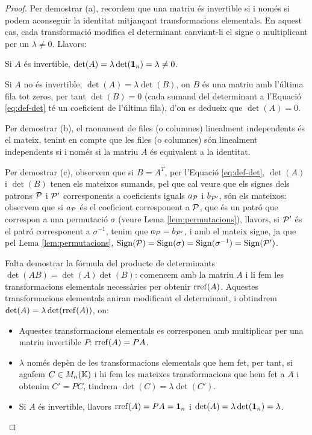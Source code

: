 \documentclass[
  11pt,
]{book}
\numberwithin{dummy}{section}
\theoremstyle{maincolornumbox}
\theoremstyle{blacknumex}
\theoremstyle{blacknumbox}
\theoremstyle{maincolornum}
\newlength\esp
\begin{document}
\begin{proof}
Per demostrar (a), recordem que una matriu és invertible si i
només si podem aconseguir la identitat mitjançant transformacions
elementals. En aquest cas, cada transformació modifica el determinant
canviant-li el signe o multiplicant per un \(\lambda\neq 0\). Llavors:

Si \(A\) és invertible, \(\det(A)=\lambda \det(\mathbf{1}_n)=\lambda \neq 0\).

Si \(A\) no és invertible, \(\det(A)=\lambda \det(B)\), on \(B\) és una matriu
amb l'última fila tot zeros, per tant \(\det(B)=0\) (cada sumand del
determinant a l'Equació
\eqref{eq:def-det} té un coeficient de l'última fila), d'on es
dedueix que \(\det(A)=0\).

Per demostrar (b), el raonament de files (o columnes) linealment
independents és el mateix, tenint en compte que les files (o columnes)
són linealment independents si i només si la matriu \(A\) és equivalent a
la identitat.

Per demostrar (c), observem que si \(B=A^T\), per l'Equació
\eqref{eq:def-det}, \(\det(A)\) i \(\det(B)\) tenen els mateixos
sumands, pel que cal veure que els signes dels patrons \(\mathcal{P}\) i
\(\mathcal{P}'\) corresponents a coeficients iguals \(a_{\mathcal{P}}\) i \(b_{\mathcal{P}'}\),
són els mateixos: observem que si \(a_{\mathcal{P}}\) és el coeficient
corresponent a \(\mathcal{P}\), que és un patró que correspon a una permutació
\(\sigma\) (veure Lema
\ref{lem:permutacions}), llavors, si \(\mathcal{P}'\) és el patró
corresponent a \(\sigma^{-1}\), tenim que \(a_{\mathcal{P}}=b_{\mathcal{P}'}\), i amb el
mateix signe, ja que pel Lema
\ref{lem:permutacions},
\(\operatorname{Sign}(\mathcal{P})=\operatorname{Sign}(\sigma)=\operatorname{Sign}(\sigma^{-1})=\operatorname{Sign}(\mathcal{P}')\).

Falta demostrar la fórmula del producte de determinants
\(\det(AB)=\det(A)\det(B)\): comencem amb la matriu \(A\) i li fem les
transformacions elementals necessàries per obtenir \(\operatorname{rref}(A)\). Aquestes
transformacions elementals aniran modificant el determinant, i obtindrem
\(\det(A)=\lambda\det(\operatorname{rref}(A))\), on:

\begin{itemize}
\item
  Aquestes transformacions elementals es corresponen amb multiplicar
  per una matriu invertible \(P\): \(\operatorname{rref}(A)=PA\).
\item
  \(\lambda\) només depèn de les transformacions elementals que hem fet,
  per tant, si agafem \(C\in M_n(\mathbb{K})\) i hi fem les mateixes
  transformacions que hem fet a \(A\) i obtenim \(C'=PC\), tindrem
  \(\det(C)=\lambda \det(C')\).
\item
  Si \(A\) és invertible, llavors \(\operatorname{rref}(A)= PA=\mathbf{1}_n\) i
  \(\det(A)=\lambda\det(\mathbf{1}_n)=\lambda\).
\end{itemize}


\end{proof}
\end{document}
